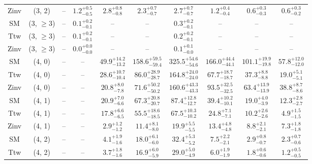 \begin{table}[h!]
{\begin{tabular}{cccccccccc}
	Zinv & (3, 2) & -- & $1.2^{+ 0.5 }_{- 0.5 }$ & $2.8^{+ 0.8 }_{- 0.8 }$ & $2.3^{+ 0.7 }_{- 0.7 }$ & $2.7^{+ 0.7 }_{- 0.7 }$ & $1.2^{+ 0.4 }_{- 0.4 }$ & $0.6^{+ 0.3 }_{- 0.3 }$ & $0.6^{+ 0.3 }_{- 0.2 }$ \\[0.5ex] 
	SM & (3, $\ge3$) & -- & $0.1^{+ 0.2 }_{- 0.1 }$ & -- & -- & $0.3^{+ 0.2 }_{- 0.1 }$ & -- & -- & -- \\[0.5ex] 
	Ttw & (3, $\ge3$) & -- & $0.1^{+ 0.2 }_{- 0.1 }$ & -- & -- & $0.2^{+ 0.2 }_{- 0.1 }$ & -- & -- & -- \\[0.5ex] 
	Zinv & (3, $\ge3$) & -- & $0.0^{+ 0.0 }_{- 0.0 }$ & -- & -- & $0.1^{+ 0.1 }_{- 0.0 }$ & -- & -- & -- \\[0.5ex] 
	SM & (4, 0) & -- & -- & $49.9^{+ 14.2 }_{- 13.2 }$ & $158.6^{+ 59.5 }_{- 59.4 }$ & $325.5^{+ 54.6 }_{- 54.6 }$ & $166.0^{+ 44.4 }_{- 44.1 }$ & $101.1^{+ 19.9 }_{- 19.8 }$ & $57.8^{+ 12.0 }_{- 12.0 }$ \\[0.5ex] 
	Ttw & (4, 0) & -- & -- & $28.6^{+ 10.7 }_{- 10.4 }$ & $86.0^{+ 28.9 }_{- 28.7 }$ & $164.8^{+ 24.0 }_{- 24.0 }$ & $67.7^{+ 18.7 }_{- 18.7 }$ & $37.3^{+ 8.8 }_{- 8.8 }$ & $19.0^{+ 5.1 }_{- 5.1 }$ \\[0.5ex] 
	Zinv & (4, 0) & -- & -- & $20.8^{+ 8.0 }_{- 7.8 }$ & $71.6^{+ 50.2 }_{- 50.2 }$ & $160.6^{+ 43.3 }_{- 43.3 }$ & $93.5^{+ 32.5 }_{- 32.5 }$ & $63.4^{+ 13.9 }_{- 13.9 }$ & $38.8^{+ 8.7 }_{- 8.6 }$ \\[0.5ex] 
	SM & (4, 1) & -- & -- & $20.9^{+ 7.0 }_{- 6.6 }$ & $67.3^{+ 20.8 }_{- 20.7 }$ & $87.4^{+ 12.8 }_{- 12.7 }$ & $39.4^{+ 10.2 }_{- 10.1 }$ & $19.0^{+ 4.0 }_{- 3.9 }$ & $12.3^{+ 2.8 }_{- 2.7 }$ \\[0.5ex] 
	Ttw & (4, 1) & -- & -- & $17.8^{+ 6.6 }_{- 6.5 }$ & $55.5^{+ 18.6 }_{- 18.5 }$ & $67.5^{+ 10.3 }_{- 10.2 }$ & $24.8^{+ 7.1 }_{- 7.1 }$ & $10.2^{+ 2.6 }_{- 2.6 }$ & $4.9^{+ 1.5 }_{- 1.5 }$ \\[0.5ex] 
	Zinv & (4, 1) & -- & -- & $2.9^{+ 1.2 }_{- 1.2 }$ & $11.4^{+ 8.1 }_{- 8.0 }$ & $19.9^{+ 5.5 }_{- 5.5 }$ & $13.4^{+ 4.8 }_{- 4.8 }$ & $8.8^{+ 2.1 }_{- 2.1 }$ & $7.3^{+ 1.8 }_{- 1.8 }$ \\[0.5ex] 
	SM & (4, 2) & -- & -- & $4.1^{+ 1.9 }_{- 1.6 }$ & $18.0^{+ 6.1 }_{- 6.0 }$ & $32.4^{+ 5.3 }_{- 5.2 }$ & $7.5^{+ 2.2 }_{- 2.1 }$ & $2.9^{+ 0.8 }_{- 0.7 }$ & $2.3^{+ 0.7 }_{- 0.6 }$ \\[0.5ex] 
	Ttw & (4, 2) & -- & -- & $3.7^{+ 1.8 }_{- 1.6 }$ & $16.9^{+ 6.0 }_{- 5.9 }$ & $29.0^{+ 5.0 }_{- 4.9 }$ & $6.0^{+ 1.9 }_{- 1.9 }$ & $1.8^{+ 0.6 }_{- 0.6 }$ & $1.2^{+ 0.5 }_{- 0.5 }$ \\[0.5ex] 

\end{tabular}}
\end{table}
